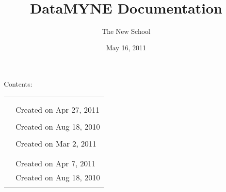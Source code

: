 \documentclass[letterpaper,10pt,english]{sphinxmanual}
\title{DataMYNE Documentation}
\date{May 16, 2011}
\author{The New School}
\begin{document}
\maketitle
\tableofcontents
{}\label{index::doc}


Contents:

\begin{tabulary}{\linewidth}{LL}
\hline

{\hyperref[generated/apps.profiles.models:module-apps.profiles.models]{}}
 & 

\\

{\hyperref[generated/apps.profiles.views:module-apps.profiles.views]{}}
 & 

\\

{\hyperref[generated/apps.profiles.fields:module-apps.profiles.fields]{}}
 & 
Created on Apr 27, 2011
\\

{\hyperref[generated/apps.profiles.forms:module-apps.profiles.forms]{}}
 & 

\\

{\hyperref[generated/apps.profiles.handlers:module-apps.profiles.handlers]{}}
 & 
Created on Aug 18, 2010
\\

{\hyperref[generated/apps.profiles.lookups:module-apps.profiles.lookups]{}}
 & 

\\

{\hyperref[generated/apps.profiles.backends:module-apps.profiles.backends]{}}
 & 
Created on Mar 2, 2011
\\

{\hyperref[generated/apps.reporting.models:module-apps.reporting.models]{}}
 & 

\\

{\hyperref[generated/apps.reporting.views:module-apps.reporting.views]{}}
 & 

\\

{\hyperref[generated/apps.reporting.forms:module-apps.reporting.forms]{}}
 & 
Created on Apr 7, 2011
\\

{\hyperref[generated/apps.reporting.handlers:module-apps.reporting.handlers]{}}
 & 
Created on Aug 18, 2010
\\

{\hyperref[generated/apps.mobile.views:module-apps.mobile.views]{}}
 & 

\\
\hline
\end{tabulary}
\end{document}
